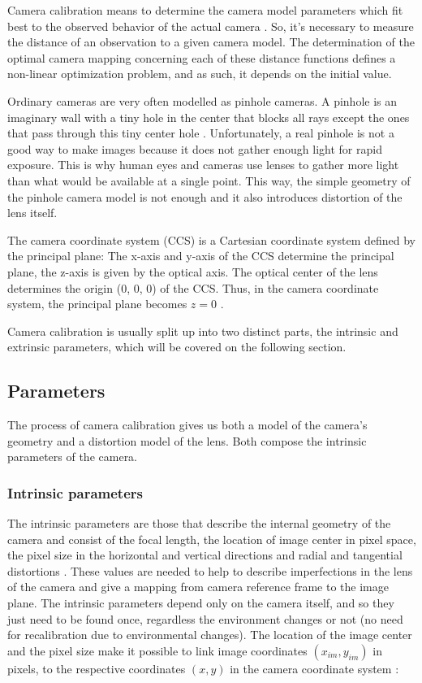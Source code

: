 \documentclass[msc, a4paper, classic, en]{ufbathesis}
\begin{document}
Camera calibration means to determine the camera model parameters which fit best to the observed behavior of the actual camera \cite{hanning2011high}. So, it's necessary to measure the distance of an observation to a given camera model. The determination of the optimal camera mapping concerning each of these distance functions defines a non-linear optimization problem, and as such, it depends on the initial value.

Ordinary cameras are very often modelled as pinhole cameras. A pinhole is an imaginary wall with a tiny hole in the center that blocks all rays except the ones that pass through this tiny center hole \cite{bradski2008learning}. Unfortunately, a real pinhole is not a good way to make images because it does not gather enough light for rapid exposure. This is why human eyes and cameras use lenses to gather more light than what would be available at a single point. This way, the simple geometry of the pinhole camera model is not enough and it also introduces distortion of the lens itself.

The camera coordinate system (CCS) is a Cartesian coordinate system defined by the principal plane: The x-axis and y-axis of the CCS determine the principal plane, the z-axis is given by the optical axis. The optical center of the lens determines the origin (0, 0, 0) of the CCS. Thus, in the camera coordinate system, the principal plane becomes ${ z = 0 }$ \cite{hanning2011high}.

Camera calibration is usually split up into two distinct parts, the intrinsic and extrinsic parameters, which will be covered on the following section.

\subsection{Parameters}

The process of camera calibration gives us both a model of the camera's geometry and a distortion model of the lens. Both compose the intrinsic parameters of the camera.

\subsubsection{Intrinsic parameters}

The intrinsic parameters are those that describe the internal geometry of the camera and consist of the focal length, the location of image center in pixel space, the pixel size in the horizontal and vertical directions and radial and tangential distortions \cite{malik2002}. These values are needed to help to describe imperfections in the lens of the camera and give a mapping from camera reference frame to the image plane. The intrinsic parameters depend only on the camera itself, and so they just need to be found once, regardless the environment changes or not (no need for recalibration due to environmental changes). The location of the image center and the pixel size make it possible to link image coordinates $(x_{im}, y_{im})$ in pixels, to the respective coordinates $(x, y)$ in the camera coordinate system \cite{malik2002}:
\end{document}
